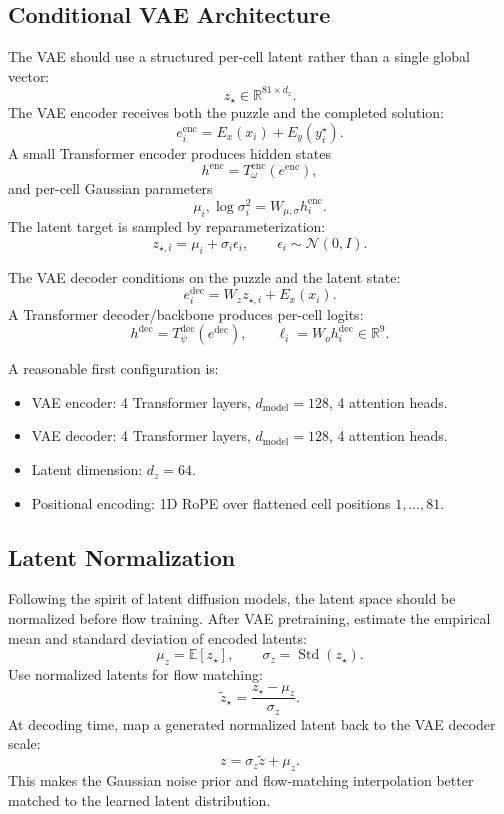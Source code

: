 \documentclass[11pt]{article}
\begin{document}
\subsection{Conditional VAE Architecture}

The VAE should use a structured per-cell latent rather than a single global vector:
\[
    z_\star\in\mathbb R^{81\times d_z}.
\]
The VAE encoder receives both the puzzle and the completed solution:
\[
    e_i^{\mathrm{enc}}
    =
    E_x(x_i)
    +
    E_y(y_i^\star).
\]
A small Transformer encoder produces hidden states
\[
    h^{\mathrm{enc}}
    =
    T_\omega^{\mathrm{enc}}(e^{\mathrm{enc}}),
\]
and per-cell Gaussian parameters
\[
    \mu_i,\log\sigma_i^2
    =
    W_{\mu,\sigma}h_i^{\mathrm{enc}}.
\]
The latent target is sampled by reparameterization:
\[
    z_{\star,i}
    =
    \mu_i+\sigma_i\epsilon_i,
    \qquad
    \epsilon_i\sim\mathcal N(0,I).
\]

The VAE decoder conditions on the puzzle and the latent state:
\[
    e_i^{\mathrm{dec}}
    =
    W_z z_{\star,i}
    +
    E_x(x_i).
\]
A Transformer decoder/backbone produces per-cell logits:
\[
    h^{\mathrm{dec}}
    =
    T_\psi^{\mathrm{dec}}(e^{\mathrm{dec}}),
    \qquad
    \ell_i = W_o h_i^{\mathrm{dec}}\in\mathbb R^9.
\]

A reasonable first configuration is:
\begin{itemize}[itemsep=0pt]
    \item VAE encoder: 4 Transformer layers, \(d_{\mathrm{model}}=128\), 4 attention heads.
    \item VAE decoder: 4 Transformer layers, \(d_{\mathrm{model}}=128\), 4 attention heads.
    \item Latent dimension: \(d_z=64\).
    \item Positional encoding: 1D RoPE over flattened cell positions \(1,\dots,81\).
\end{itemize}

\subsection{Latent Normalization}

Following the spirit of latent diffusion models, the latent space should be normalized before flow training. After VAE pretraining, estimate the empirical mean and standard deviation of encoded latents:
\[
    \mu_z=\mathbb E[z_\star],
    \qquad
    \sigma_z=\operatorname{Std}(z_\star).
\]
Use normalized latents for flow matching:
\[
    \tilde z_\star
    =
    \frac{z_\star-\mu_z}{\sigma_z}.
\]
At decoding time, map a generated normalized latent back to the VAE decoder scale:
\[
    z = \sigma_z\tilde z+\mu_z.
\]
This makes the Gaussian noise prior and flow-matching interpolation better matched to the learned latent distribution.
\end{document}

